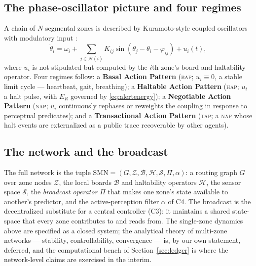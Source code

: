\documentclass[utf8]{FrontiersinHarvard}
\newcommand{\bap}{\textsc{bap}}
\newcommand{\hap}{\textsc{hap}}
\newcommand{\nap}{\textsc{nap}}
\newcommand{\tap}{\textsc{tap}}
\begin{document}
\subsection{The phase-oscillator picture and four regimes}
A chain of $N$ segmental zones is described by Kuramoto-style coupled oscillators with modulatory input \citep{Kuramoto1984Oscillations}:
\begin{equation}
\dot\theta_i = \omega_i + \sum_{j\in\mathcal N(i)} K_{ij}\sin(\theta_j-\theta_i-\varphi_{ij}) + u_i(t), \label{eq:kuramoto}
\end{equation}
where $u_i$ is not stipulated but computed by the $i$th zone's board and haltability operator. Four regimes follow: a \textbf{Basal Action Pattern} (\bap; $u_i\equiv0$, a stable limit cycle --- heartbeat, gait, breathing); a \textbf{Haltable Action Pattern} (\hap; $u_i$ a halt pulse, with $E_R$ governed by \eqref{eq:alertenergy}); a \textbf{Negotiable Action Pattern} (\nap; $u_i$ continuously rephases or reweights the coupling in response to perceptual predicates); and a \textbf{Transactional Action Pattern} (\tap; a \nap{} whose halt events are externalized as a public trace recoverable by other agents).

\subsection{The network and the broadcast}
The full network is the tuple $\mathrm{SMN}=(G,\mathcal Z,\mathcal B,\mathcal H,\mathcal S,\Pi,\alpha)$: a routing graph $G$ over zone nodes $\mathcal Z$, the local boards $\mathcal B$ and haltability operators $\mathcal H$, the sensor space $\mathcal S$, the \emph{broadcast operator} $\Pi$ that makes one zone's state available to another's predictor, and the active-perception filter $\alpha$ of C4. The broadcast is the decentralized substitute for a central controller (C3): it maintains a shared state-space that every zone contributes to and reads from. The single-zone dynamics above are specified as a closed system; the analytical theory of multi-zone networks --- stability, controllability, convergence --- is, by our own statement, deferred, and the computational bench of Section~\ref{sec:ledger} is where the network-level claims are exercised in the interim.
\end{document}
